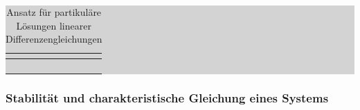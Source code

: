 \begin{table}[H]
\setlength{\arrayrulewidth}{.1em}
\caption{Ansatz f\"{u}r partikul\"{a}re L\"{o}sungen linearer Differenzengleichungen}
\setlength{\fboxsep}{0pt}%
\colorbox{lightgray}{%
%
\begin{tabular}{| c | c |}
\hline
\parbox[c][0.35in][c]{0.5in}{\smallskip\centering\textbf{\selectfont{Schritt}}} & \parbox[c][0.35in][c]{6in}{\smallskip\centering\textbf{\selectfont{Beschreibung}}}\\ \hline

\parbox[c][2.3in][c]{0.5in}{} & 
\parbox[c][2.3in][c]{6in}{}\\ \hline

\parbox[c][0.4in][c]{0.5in}{} & \parbox[c][0.4in][c]{6in}{}\\ \hline

\parbox[c][0.4in][c]{0.5in}{} & 
\parbox[c][0.4in][c]{6in}{}\\ \hline

\parbox[c][0.4in][c]{0.5in}{} & 
\parbox[c][0.4in][c]{6in}{}\\ \hline

\end{tabular}%
}
\label{tab:fourthree}
\end{table}

\clearpage

\subsubsection{Stabilit\"{a}t und charakteristische Gleichung eines Systems}


